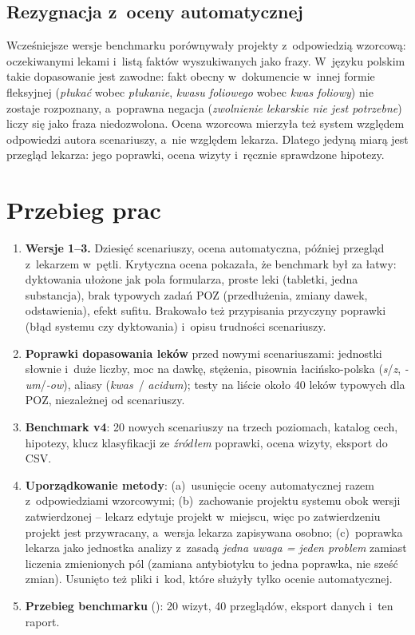\documentclass[11pt,a4paper]{article}
\begin{document}
\subsection{Rezygnacja z~oceny automatycznej}
Wcześniejsze wersje benchmarku porównywały projekty z~odpowiedzią wzorcową: oczekiwanymi lekami i~listą faktów wyszukiwanych
jako frazy. W~języku polskim takie dopasowanie jest zawodne: fakt obecny w~dokumencie w~innej formie fleksyjnej
(\emph{płukać} wobec \emph{płukanie}, \emph{kwasu foliowego} wobec \emph{kwas foliowy}) nie zostaje rozpoznany,
a~poprawna negacja (\emph{zwolnienie lekarskie nie jest potrzebne}) liczy się jako fraza niedozwolona.
Ocena wzorcowa mierzyła też system względem odpowiedzi autora scenariuszy, a~nie względem lekarza.
Dlatego jedyną miarą jest przegląd lekarza: jego poprawki, ocena wizyty i~ręcznie sprawdzone hipotezy.

\section{Przebieg prac}

\begin{enumerate}
  \item \textbf{Wersje 1--3.} Dziesięć scenariuszy, ocena automatyczna, później przegląd z~lekarzem w~pętli. Krytyczna ocena
        pokazała, że benchmark był za łatwy: dyktowania ułożone jak pola formularza, proste leki (tabletki, jedna substancja),
        brak typowych zadań POZ (przedłużenia, zmiany dawek, odstawienia), efekt sufitu. Brakowało też przypisania przyczyny
        poprawki (błąd systemu czy dyktowania) i~opisu trudności scenariuszy.
  \item \textbf{Poprawki dopasowania leków} przed nowymi scenariuszami: jednostki słownie i~duże liczby, moc na dawkę,
        stężenia, pisownia łacińsko-polska (\emph{s}/\emph{z}, \emph{-um}/\emph{-ow}), aliasy (\emph{kwas}~/ \emph{acidum});
        testy na liście około 40 leków typowych dla POZ, niezależnej od scenariuszy.
  \item \textbf{Benchmark v4}: 20 nowych scenariuszy na trzech poziomach, katalog cech, hipotezy, klucz klasyfikacji
        ze \emph{źródłem} poprawki, ocena wizyty, eksport do CSV.
  \item \textbf{Uporządkowanie metody}: (a)~usunięcie oceny automatycznej razem z~odpowiedziami wzorcowymi;
        (b)~zachowanie projektu systemu obok wersji zatwierdzonej -- lekarz edytuje projekt w~miejscu, więc po zatwierdzeniu
        projekt jest przywracany, a~wersja lekarza zapisywana osobno; (c)~poprawka lekarza jako jednostka analizy
        z~zasadą \emph{jedna uwaga = jeden problem} zamiast liczenia zmienionych pól (zamiana antybiotyku to jedna poprawka,
        nie sześć zmian). Usunięto też pliki i~kod, które służyły tylko ocenie automatycznej.
  \item \textbf{Przebieg benchmarku} (\runDate): 20 wizyt, 40 przeglądów, eksport danych i~ten raport.
\end{enumerate}
\end{document}
